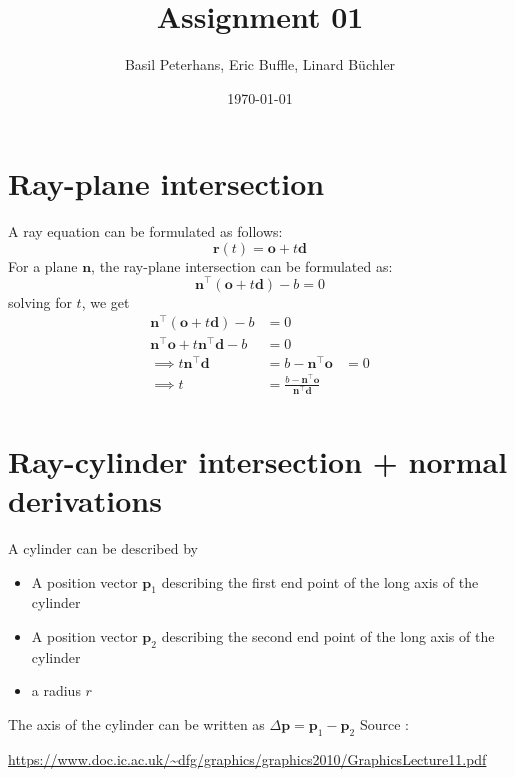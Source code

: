 \documentclass[a4paper, 12pt]{article}
\begin{document}
	\setlength{\parindent}{0cm}
	\renewcommand{\baselinestretch}{0.5}
	\title{Assignment 01}
	\author{Basil Peterhans, Eric Buffle, Linard Büchler}
	\date{\today}
	\maketitle
	\tableofcontents{}
\section{Ray-plane intersection}
A ray equation can be formulated as follows:
$$
\textbf{r}(t) = \textbf{o}+ t\textbf{d}
$$
For a plane $\textbf{n}$, the ray-plane intersection can be formulated as:
$$
\textbf{n}^\top (\textbf{o}+ t\textbf{d})- b = 0
$$
solving for $t$, we get
\begin{align*}
\textbf{n}^\top (\textbf{o}+ t\textbf{d})- b &= 0\\
\textbf{n}^\top\textbf{o} + t\textbf{n}^\top\textbf{d} - b &=0\\
\implies t\textbf{n}^\top\textbf{d} &=b - \textbf{n}^\top\textbf{o}  &=0\\
\implies t &=\frac{b - \textbf{n}^\top\textbf{o}}{\textbf{n}^\top\textbf{d}} \\
\end{align*}
\section{Ray-cylinder intersection + normal derivations}
A cylinder can be described by
\begin{itemize}
  \item A position vector $\textbf{p}_1$ describing the first end point of the long axis of the cylinder
  \item A position vector $\textbf{p}_2$ describing the second end point of the long axis of the cylinder
  \item a radius $r$
\end{itemize}
The axis of the cylinder can be written as $\Delta \textbf{p} = \textbf{p}_1 - \textbf{p}_2$ 
Source : \cite{Pfister_Harvard}

\begin{thebibliography}{10} %
 \url{https://www.doc.ic.ac.uk/~dfg/graphics/graphics2010/GraphicsLecture11.pdf}%
%
%
%

\end{thebibliography}
\end{document}
